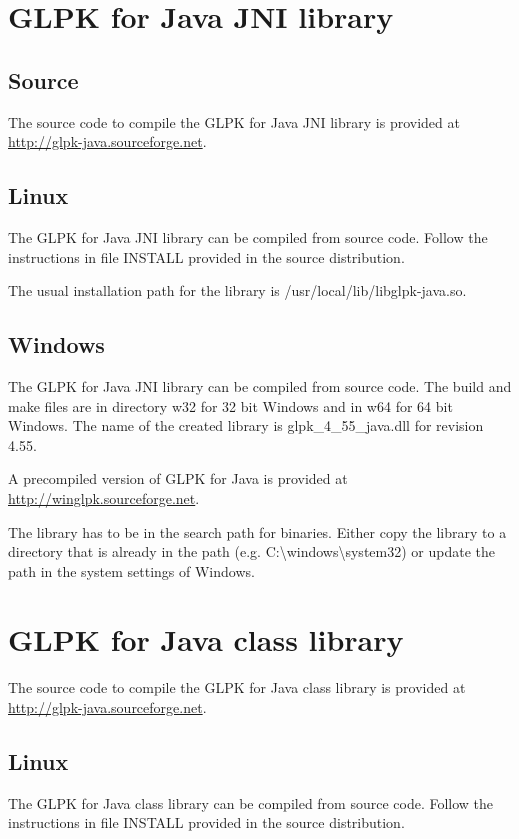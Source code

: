 \documentclass[a4paper,11pt]{report}
\newcommand{\glpkVersionMajor}{4}
\newcommand{\glpkVersionMinor}{55}
\begin{document}
\section{GLPK for Java JNI library}
\subsection{Source}
The source code to compile the GLPK for Java JNI library is provided at \linebreak\href{http://glpk-java.sourceforge.net}{http://glpk-java.sourceforge.net}.

\subsection{Linux}
The GLPK for Java JNI library can be compiled from source code. Follow the instructions in file INSTALL provided in the source distribution.

The usual installation path for the library is /usr/local/lib/libglpk-java.so.
\subsection{Windows}
The GLPK for Java JNI library can be compiled from source code. The build and make files are in directory w32 for 32 bit Windows and in w64 for 64 bit Windows. The name of the created library is glpk\_\glpkVersionMajor\_\glpkVersionMinor\_java.dll for revision \glpkVersionMajor.\glpkVersionMinor.

A precompiled version of GLPK for Java is provided at \linebreak\href{http://winglpk.sourceforge.net}{http://winglpk.sourceforge.net}.

The library has to be in the search path for binaries. Either copy the library to a directory that is already in the path (e.g. C:\textbackslash windows\textbackslash system32) or update the path in the system settings of Windows.

\section{GLPK for Java class library}
The source code to compile the GLPK for Java class library is provided at \linebreak\href{http://glpk-java.sourceforge.net}{http://glpk-java.sourceforge.net}.

\subsection{Linux}
The GLPK for Java class library can be compiled from source code. Follow the instructions in file INSTALL provided in the source distribution.
\end{document}
